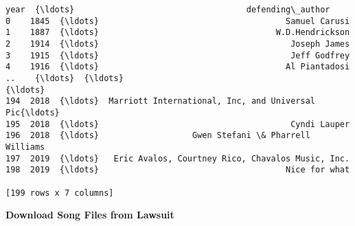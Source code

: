 \documentclass[11pt]{article}
\newcommand{\prompt}[4]{
        \llap{{\color{#2}[#3]: #4}}\vspace{-1.25em}
    }
\begin{document}
            \begin{tcolorbox}[breakable, boxrule=.5pt, size=fbox, pad at break*=1mm, opacityfill=0]
\prompt{Out}{outcolor}{ }{\hspace{3.5pt}}
\begin{Verbatim}[commandchars=\\\{\}]
     year  {\ldots}                                   defending\_author
0    1845  {\ldots}                                      Samuel Carusi
1    1887  {\ldots}                                    W.D.Hendrickson
2    1914  {\ldots}                                       Joseph James
3    1915  {\ldots}                                       Jeff Godfrey
4    1916  {\ldots}                                      Al Piantadosi
..    {\ldots}  {\ldots}                                                {\ldots}
194  2018  {\ldots}  Marriott International, Inc, and Universal Pic{\ldots}
195  2018  {\ldots}                                       Cyndi Lauper
196  2018  {\ldots}                   Gwen Stefani \& Pharrell Williams
197  2019  {\ldots}   Eric Avalos, Courtney Rico, Chavalos Music, Inc.
198  2019  {\ldots}                                      Nice for what

[199 rows x 7 columns]
\end{Verbatim}
\end{tcolorbox}
        
    \textbf{Download Song Files from Lawsuit}
\end{document}
